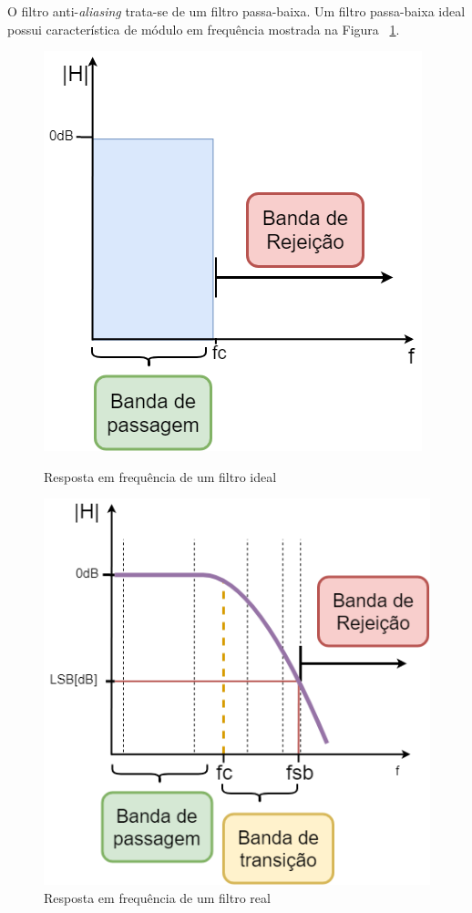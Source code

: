 \documentclass[
	12pt,				%
	openright,			%
	twoside,			%
	a4paper,			%
	english,			%
	french,				%
	spanish,			%
	brazil,				%
	]{abntex2}
\begin{document}
		O filtro anti-\textit{aliasing} trata-se de um filtro passa-baixa. Um filtro passa-baixa ideal possui
		característica de módulo em frequência mostrada na Figura ~\ref{fig:filtroIdeal}.

		\begin{figure}[!ht]
			\centering
			\begin{minipage}{.4\linewidth}
				\centering
				\includegraphics[width=.8\linewidth]{../Fotos/Diagramas/sinalFaaADC/filtroIdeal.png}
				\caption{Resposta em frequência de um filtro ideal}
				\label{fig:filtroIdeal}
			\end{minipage}
			\hfill\vline\hfill
			\begin{minipage}{.4\linewidth}
				\centering
				\includegraphics[width=\linewidth]{../Fotos/Diagramas/sinalFaaADC/filtroReal.png}
				\caption{Resposta em frequência de um filtro real}
			\end{minipage}
		\end{figure}
\end{document}
